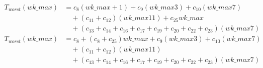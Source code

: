 \begin{subequations}
\label{eq:analyse-arlabeling-calcregiondata-2}
\begin{align}
\label{eq:analyse-arlabeling-calcregiondata-2-1}
T_{worst}(\mathit{wk\_max})& = c_{8} (\mathit{wk\_max} + 1) + c_{9}(\mathit{wk\_max}3) + c_{10}(\mathit{wk\_max} 7) \\
& \quad + (c_{11} + c_{12})(\mathit{wk\_max}11) + c_{25}\mathit{wk\_max} \nonumber \\
& \quad + (c_{13} + c_{14} + c_{16} + c_{17} + c_{19} + c_{20} + c_{22} + c_{23})(\mathit{wk\_max}7) \nonumber \\
\label{eq:analyse-arlabeling-calcregiondata-2-2}
T_{worst}(\mathit{wk\_max})& = c_{8} + (c_{8} + c_{25})\mathit{wk\_max} + c_{9}(\mathit{wk\_max}3)
 + c_{10}(\mathit{wk\_max} 7) \\
& \quad + (c_{11} + c_{12})(\mathit{wk\_max}11) \nonumber \\
& \quad + (c_{13} + c_{14} + c_{16} + c_{17} + c_{19} + c_{20} + c_{22} + c_{23})(\mathit{wk\_max}7) \nonumber
\end{align}	
\end{subequations}
